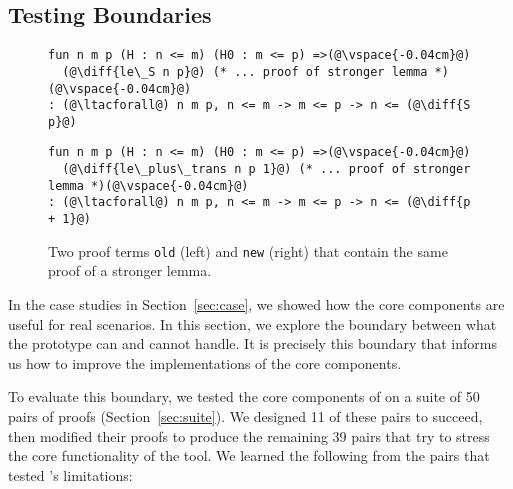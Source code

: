 \subsection{Testing Boundaries}
\label{sec:eval}

\begin{figure*}[ht]
\begin{minipage}{0.48\textwidth}
\begin{lstlisting}[language=coq]
fun n m p (H : n <= m) (H0 : m <= p) =>(@\vspace{-0.04cm}@)
  (@\diff{le\_S n p}@) (* ... proof of stronger lemma *)(@\vspace{-0.04cm}@)
: (@\ltacforall@) n m p, n <= m -> m <= p -> n <= (@\diff{S p}@)
\end{lstlisting}
\end{minipage}
\hfill
\begin{minipage}{0.48\textwidth}
\begin{lstlisting}[language=coq]
fun n m p (H : n <= m) (H0 : m <= p) =>(@\vspace{-0.04cm}@)
  (@\diff{le\_plus\_trans n p 1}@) (* ... proof of stronger lemma *)(@\vspace{-0.04cm}@)
: (@\ltacforall@) n m p, n <= m -> m <= p -> n <= (@\diff{p + 1}@)
\end{lstlisting}
\end{minipage}
\vspace{-.35cm}
\caption{Two proof terms \lstinline{old} (left) and \lstinline{new} (right) that contain the same proof of a stronger lemma.}
\label{fig:stronger}
\end{figure*}

\lstset{language=coq, aboveskip=3pt,belowskip=3pt}

In the case studies in Section~\ref{sec:case}, we showed how
the core components are useful for real scenarios.
In this section, we explore the boundary between what the \sysname prototype can and cannot handle.
It is precisely this boundary that informs us how to improve the implementations of the
core components.

To evaluate this boundary, we tested the core components of \sysname on a suite of 50 pairs of proofs (Section~\ref{sec:suite}).
We designed 11 of these pairs to succeed, then modified their proofs to produce the remaining 39 pairs
that try to stress the core functionality of the tool.
We learned the following from the pairs
that tested \sysname's limitations:

